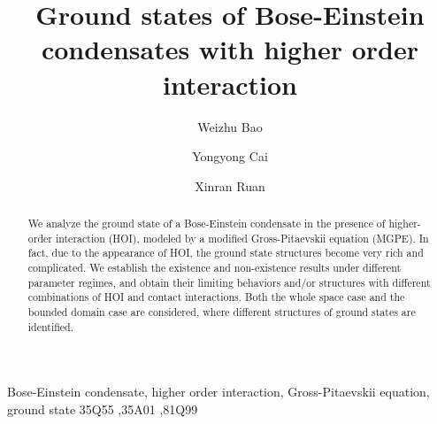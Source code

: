 \documentclass{elsarticle}
\begin{document}
\begin{frontmatter}

\title{Ground states  of Bose-Einstein condensates with higher order interaction}%

\author{Weizhu Bao}%
\address{Department of Mathematics,  National University of Singapore, Singapore 119076, Singapore}

\author{Yongyong Cai}
\address{Beijing Computational Science Research Center,  No. 10 West Dongbeiwang Road, Haidian District, Beijing 100193,
P. R. China}

\author{Xinran Ruan\corref{}}
\address{Department of Mathematics,  National University of Singapore, Singapore 119076, Singapore}

\begin{abstract}
We analyze the ground state of a Bose-Einstein condensate in the presence of higher-order interaction (HOI),
modeled by a modified Gross-Pitaevskii equation (MGPE). In fact, due to the appearance of HOI,
the ground state structures become very rich and complicated.
We establish the existence and  non-existence
results under different parameter regimes, and obtain their limiting behaviors and/or structures
with different combinations of HOI and contact interactions. Both the whole space case and  the bounded domain case are considered, where
different structures of ground states are identified.
\end{abstract}

\begin{keyword}
Bose-Einstein condensate, higher order interaction,
 Gross-Pitaevskii equation, ground state
\MSC[2010] 35Q55 \sep 35A01 \sep 81Q99
\end{keyword}
\end{frontmatter}

\end{document}
